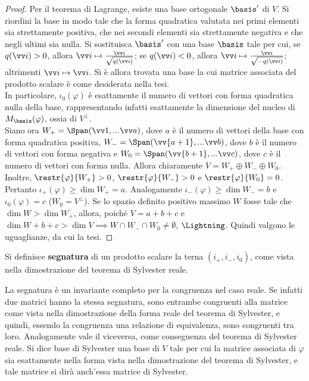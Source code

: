 \documentclass[11pt]{article}
\begin{document}
	\begin{proof}
		Per il teorema di Lagrange, esiste una base ortogonale $\basis'$ di $V$.
		Si riordini la base in modo tale che la forma quadratica valutata nei primi elementi sia strettamente positiva, che nei secondi elementi sia strettamente negativa e che negli ultimi sia nulla. Si sostituisca
		$\basis'$ con una base $\basis$ tale per cui, se $q(\vv i) > 0$,
		allora $\vv i \mapsto \frac{\vv i}{\sqrt{q(\vv i)}}$; se
		$q(\vv i) < 0$, allora $\vv i \mapsto \frac{\vv i}{\sqrt{-q(\vv i)}}$;
		altrimenti $\vv i \mapsto \vv i$. Si è allora trovata una base
		la cui matrice associata del prodotto scalare è come desiderata nella
		tesi. \\
		
		In particolare, $\iota_0(\varphi)$ è esattamente il numero di vettori
		con forma quadratica nulla della base, rappresentando infatti
		esattamente la dimensione del nucleo di $M_\basis(\varphi)$,
		ossia di $V^\perp$. \\
		
		Siano ora $W_+ = \Span(\vv 1, ... \vv a)$, dove $a$ è il numero
		di vettori della base con forma quadratica positiva,
		$W_- = \Span(\vv{a+1}, ... \vv b)$, dove $b$ è il numero di vettori
		con forma negativa e
		$W_0 = \Span(\vv{b+1}, ... \vv c)$, dove $c$ è il numero di vettori
		con forma nulla.
		Allora chiaramente $V = W_+ \oplus W_- \oplus W_0$. Inoltre,
		$\restr{\varphi}{W_+} > 0$, $\restr{\varphi}{W_-} > 0$ e
		$\restr{\varphi}{W_0} = 0$. Pertanto $\iota_+(\varphi) \geq \dim W_+ = a$. Analogamente $\iota_-(\varphi) \geq \dim W_- = b$ e
		$\iota_0(\varphi) = c$ ($W_0 = V^\perp$). Se lo spazio definito
		positivo massimo $W$ fosse tale che $\dim W > \dim W_+$, allora,
		poiché $V = a + b + c$ e $\dim W + b + c > \dim V \implies
		W \cap W_- \cap W_0 \neq \emptyset$, $\Lightning$. Quindi valgono
		le uguaglianze, da cui la tesi.
	\end{proof}

	\begin{definition}
		Si definisce \textbf{segnatura} di un prodotto scalare
		la terna $(i_+, i_-, i_0)$, come vista nella dimostrazione
		del teorema di Sylvester reale.
	\end{definition}

	\begin{remark} \nl
		\li La segnatura è un invariante completo per la congruenza nel caso reale. Se infatti due matrici hanno la stessa segnatura, sono
		entrambe congruenti alla matrice come vista nella dimostrazione
		della forma reale del teorema di Sylvester, e quindi, essendo
		la congruenza una relazione di equivalenza, sono congruenti
		tra loro. Analogamente vale il viceversa, come conseguenza del
		teorema di Sylvester reale.
		\li Si dice base di Sylvester una base di $V$ tale per cui la
		matrice associata di $\varphi$ sia esattamente nella forma
		vista nella dimostrazione del teorema di Sylvester, e
		tale matrice si dirà anch'essa matrice di Sylvester.
		
	\end{remark}
\end{document}
